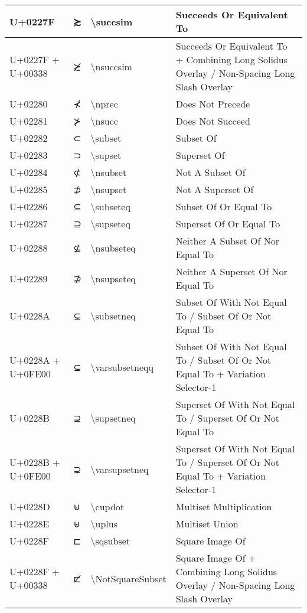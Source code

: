 \begin{table}[h]
\begin{tabulary}{\linewidth}{|L|L|L|L|}
\hline
U+0227F & ≿ & {\textbackslash}succsim & Succeeds Or Equivalent To \\
\hline
U+0227F + U+00338 & ≿̸ & {\textbackslash}nsuccsim & Succeeds Or Equivalent To + Combining Long Solidus Overlay / Non-Spacing Long Slash Overlay \\
\hline
U+02280 & ⊀ & {\textbackslash}nprec & Does Not Precede \\
\hline
U+02281 & ⊁ & {\textbackslash}nsucc & Does Not Succeed \\
\hline
U+02282 & ⊂ & {\textbackslash}subset & Subset Of \\
\hline
U+02283 & ⊃ & {\textbackslash}supset & Superset Of \\
\hline
U+02284 & ⊄ & {\textbackslash}nsubset & Not A Subset Of \\
\hline
U+02285 & ⊅ & {\textbackslash}nsupset & Not A Superset Of \\
\hline
U+02286 & ⊆ & {\textbackslash}subseteq & Subset Of Or Equal To \\
\hline
U+02287 & ⊇ & {\textbackslash}supseteq & Superset Of Or Equal To \\
\hline
U+02288 & ⊈ & {\textbackslash}nsubseteq & Neither A Subset Of Nor Equal To \\
\hline
U+02289 & ⊉ & {\textbackslash}nsupseteq & Neither A Superset Of Nor Equal To \\
\hline
U+0228A & ⊊ & {\textbackslash}subsetneq & Subset Of With Not Equal To / Subset Of Or Not Equal To \\
\hline
U+0228A + U+0FE00 & ⊊︀ & {\textbackslash}varsubsetneqq & Subset Of With Not Equal To / Subset Of Or Not Equal To + Variation Selector-1 \\
\hline
U+0228B & ⊋ & {\textbackslash}supsetneq & Superset Of With Not Equal To / Superset Of Or Not Equal To \\
\hline
U+0228B + U+0FE00 & ⊋︀ & {\textbackslash}varsupsetneq & Superset Of With Not Equal To / Superset Of Or Not Equal To + Variation Selector-1 \\
\hline
U+0228D & ⊍ & {\textbackslash}cupdot & Multiset Multiplication \\
\hline
U+0228E & ⊎ & {\textbackslash}uplus & Multiset Union \\
\hline
U+0228F & ⊏ & {\textbackslash}sqsubset & Square Image Of \\
\hline
U+0228F + U+00338 & ⊏̸ & {\textbackslash}NotSquareSubset & Square Image Of + Combining Long Solidus Overlay / Non-Spacing Long Slash Overlay \\

\end{tabulary}
\end{table}
